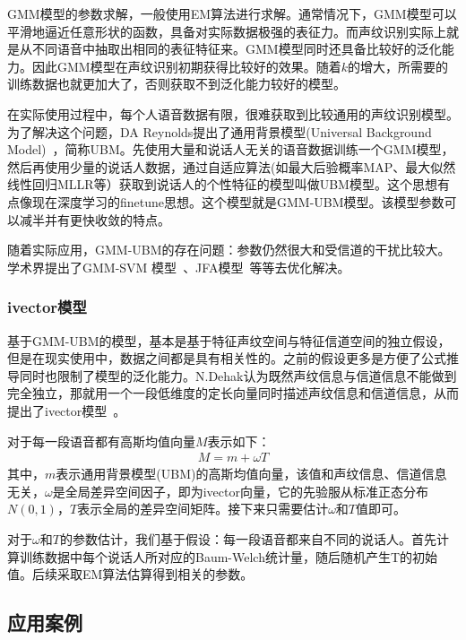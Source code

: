 \documentclass[graybox,envcountchap,sectrefs]{svmono}
\begin{document}
GMM模型的参数求解，一般使用EM算法进行求解。通常情况下，GMM模型可以平滑地逼近任意形状的函数，具备对实际数据极强的表征力。而声纹识别实际上就是从不同语音中抽取出相同的表征特征来。GMM模型同时还具备比较好的泛化能力。因此GMM模型在声纹识别初期获得比较好的效果。随着$k$的增大，所需要的训练数据也就更加大了，否则获取不到泛化能力较好的模型。

在实际使用过程中，每个人语音数据有限，很难获取到比较通用的声纹识别模型。为了解决这个问题，DA Reynolds提出了通用背景模型(Universal Background Model)~\cite{reynolds2000speaker}，简称UBM。先使用大量和说话人无关的语音数据训练一个GMM模型，然后再使用少量的说话人数据，通过自适应算法(如最大后验概率MAP、最大似然线性回归MLLR等）获取到说话人的个性特征的模型叫做UBM模型。这个思想有点像现在深度学习的finetune思想。这个模型就是GMM-UBM模型。该模型参数可以减半并有更快收敛的特点。

随着实际应用，GMM-UBM的存在问题：参数仍然很大和受信道的干扰比较大。学术界提出了GMM-SVM 模型~\cite{campbell2006svm}、JFA模型~\cite{kenny2005joint}等等去优化解决。

\subsubsection{ivector模型}
基于GMM-UBM的模型，基本是基于特征声纹空间与特征信道空间的独立假设，但是在现实使用中，数据之间都是具有相关性的。之前的假设更多是方便了公式推导同时也限制了模型的泛化能力。N.Dehak认为既然声纹信息与信道信息不能做到完全独立，那就用一个一段低维度的定长向量同时描述声纹信息和信道信息，从而提出了ivector模型~\cite{dehak2010front}。

对于每一段语音都有高斯均值向量$M$表示如下：
\begin{equation}
\label{eq:ivector}
\begin{aligned}
M = m + \omega T
\end{aligned}
\end{equation}
其中，$m$表示通用背景模型(UBM)的高斯均值向量，该值和声纹信息、信道信息无关，$\omega$是全局差异空间因子，即为ivector向量，它的先验服从标准正态分布$N(0,1)$，$T$表示全局的差异空间矩阵。接下来只需要估计$\omega$和$T$值即可。

对于$\omega$和$T$的参数估计，我们基于假设：每一段语音都来自不同的说话人。首先计算训练数据中每个说话人所对应的Baum-Welch统计量，随后随机产生T的初始值。后续采取EM算法估算得到相关的参数。


\subsection{应用案例}
\end{document}

